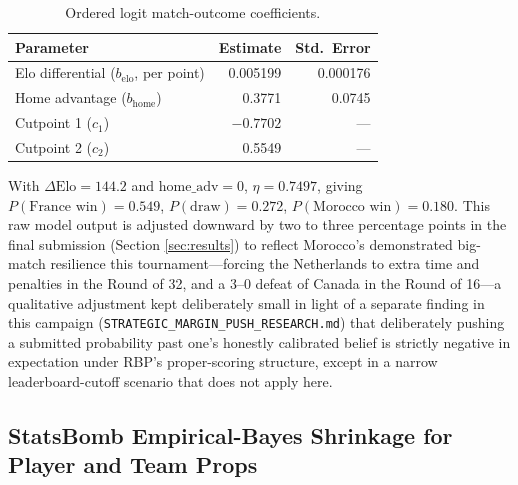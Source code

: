 \documentclass[11pt]{article}
\begin{document}
\begin{table}[H]
\centering
\caption{Ordered logit match-outcome coefficients.}
\label{tab:ologitcoefs}
\begin{tabular}{lrr}
\toprule
Parameter & Estimate & Std.\ Error \\
\midrule
Elo differential ($b_{\text{elo}}$, per point) & 0.005199 & 0.000176 \\
Home advantage ($b_{\text{home}}$) & 0.3771 & 0.0745 \\
Cutpoint 1 ($c_1$) & $-0.7702$ & --- \\
Cutpoint 2 ($c_2$) & 0.5549 & --- \\
\bottomrule
\end{tabular}
\end{table}

With $\Delta\mathrm{Elo} = 144.2$ and $\mathrm{home\_adv} = 0$, $\eta = 0.7497$, giving
$P(\text{France win}) = 0.549$, $P(\text{draw}) = 0.272$, $P(\text{Morocco win}) = 0.180$.
This raw model output is adjusted downward by two to three percentage points in the final
submission (Section \ref{sec:results}) to reflect Morocco's demonstrated big-match
resilience this tournament---forcing the Netherlands to extra time and penalties in the
Round of 32, and a 3--0 defeat of Canada in the Round of 16---a qualitative adjustment kept
deliberately small in light of a separate finding in this campaign
(\texttt{STRATEGIC\_MARGIN\_PUSH\_RESEARCH.md}) that deliberately pushing a submitted
probability past one's honestly calibrated belief is strictly negative in expectation under
RBP's proper-scoring structure, except in a narrow leaderboard-cutoff scenario that does
not apply here.

\subsection{StatsBomb Empirical-Bayes Shrinkage for Player and Team Props}
\end{document}
